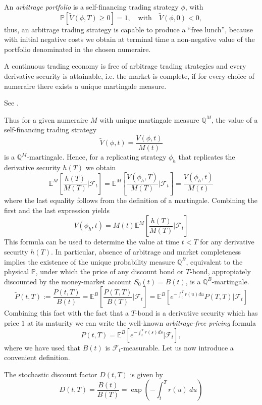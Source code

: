 An {\sl arbitrage portfolio} is a self-financing trading strategy
$\phi$, with 
$$\mathbb{P}[\widetilde{V}(\phi,T)\geq 0]=1, \quad\textrm{with}\quad
\widetilde{V}(\phi,0)<0,  
$$ 
thus, an arbitrage trading strategy is capable to produce a ``free
lunch'', because with initial negative costs we obtain at terminal 
time a non-negative value of the portfolio denominated in the chosen
numeraire.
\begin{tma} 
A continuous trading economy is free of arbitrage trading strategies
and every derivative security is attainable, i.e. the market is
complete, if for every choice of numeraire there exists a unique
martingale measure.
\end{tma}
\begin{demo}
See \cite{HaKreps:1978}. 
\end{demo}

Thus for a given numeraire $M$ with unique martingale measure
$\mathbb{Q}^M$, the value of a self-financing trading strategy
$$
\widetilde{V}(\phi,t)=\frac{V(\phi,t)}{M(t)}
$$
is a $\mathbb{Q}^M$-martingale. Hence, for a replicating strategy
$\phi_h$ that replicates the derivative security $h(T)$ we obtain
$$
\mathbb{E}^M \left[\frac{h(T)}{M(T)}\Big|\mathcal{F}_t \right]=
\mathbb{E}^M\left[\frac{V(\phi_h,T)}{M(T)}\Big|\mathcal{F}_t\right]= 
\frac{V(\phi_h,t)}{M(t)}
$$
where the last equality follows from the definition of a
martingale. Combining the first and the last expression yields
\begin{equation}
\label{eq:FundEqAssetPricing}
V(\phi_h, t)=M(t)\mathbb{E}^M\left[
  \frac{h(T)}{M(T)}\Big|\mathcal{F}_t\right]  
\end{equation}
This formula can be used to determine the value at time $t<T$ for any
derivative security $h(T)$. In particular, absence of arbitrage and
market completeness implies the existence of the unique probability
measure $\mathbb{Q}^B$, equivalent to the physical $\mathbb{P}$, under
which the price of any discount bond or $T$-bond, appropiately
discounted by the money-market account $S_0(t)=B(t)$, is a
$\mathbb{Q}^B$-martingale. 
$$
\widetilde{P}(t,T):=\frac{P(t,T)}{B(t)}=\mathbb{E}^B\left[
  \frac{P(T,T)}{B(T)}\Big|\mathcal{F}_t\right]=\mathbb{E}^B \left[ 
  e^{-\int_0^T r(u) du}P(T,T)\bigg|\mathcal{F}_t\right] 
$$
Combining this fact with the fact that a $T$-bond is a derivative
security which has price $1$ at its maturity we can write the
well-known {\sl arbitrage-free pricing} formula 
\begin{equation} 
\label{ArbitrageFree}
P(t,T)=\mathbb{E}^{B} \left[  e^{-\int_t^T r(s) ds} \bigg| \mathcal{F}_t \right],
\end{equation}
where we have used that $B(t)$ is $\mathcal{F}_t$-measurable. Let us
now introduce a convenient definition.\newpage \begin{defn} The stochastic discount
  factor $D(t,T)$ is given by
\begin{equation}
D(t,T)=\frac{B(t)}{B(T)}=\exp\left(-\int_t^T r(u)\: du\right)
\end{equation}
\end{defn}
\newpage\mbox{}\thispagestyle{empty}
